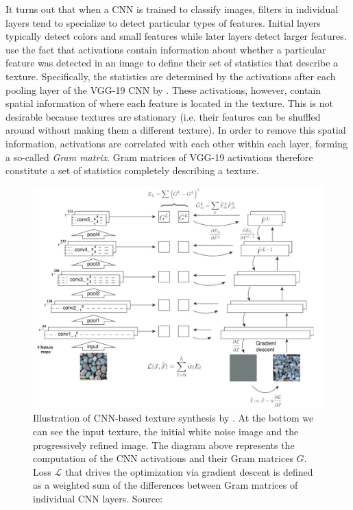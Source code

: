 It turns out that when a CNN is trained to classify images, filters in individual layers tend to specialize to detect particular types of features. Initial layers typically detect colors and small features while later layers detect larger features. \citet{Gatys2015} use the fact that activations contain information about whether a particular feature was detected in an image to define their set of statistics that describe a texture. Specifically, the statistics are determined by the activations after each pooling layer of the VGG-19 CNN by \citet{Simonyan2014}. These activations, however, contain spatial information of where each feature is located in the texture. This is not desirable because textures are stationary (i.e. their features can be shuffled around without making them a different texture). In order to remove this spatial information, activations are correlated with each other within each layer, forming a so-called \textit{Gram matrix}. Gram matrices of VGG-19 activations therefore constitute a set of statistics completely describing a texture.

\begin{figure}[ht]
    \centering
    \includegraphics[width=\textwidth]{images/02-gatys_method.jpg}
    \caption{Illustration of CNN-based texture synthesis by \citet{Gatys2015}. At the bottom we can see the input texture, the initial white noise image and the progressively refined image. The diagram above represents the computation of the CNN activations and their Gram matrices \(G\). Loss \(\mathcal{L}\) that drives the optimization via gradient descent is defined as a weighted sum of the differences between Gram matrices of individual CNN layers. Source: \citet{Gatys2015}}
    \label{fig:background_gatys_method}
\end{figure}

